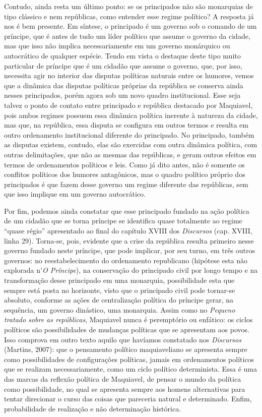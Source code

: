 Contudo, ainda resta um último ponto: se os principados não são
monarquias de tipo clássico e nem repúblicas, como entender esse regime
político? A resposta já nos é bem presente. Em síntese, o principado é
um governo sob o comando de um príncipe, que é antes de tudo um líder
político que assume o governo da cidade, mas que isso não implica
necessariamente em um governo monárquico ou autocrático de qualquer
espécie. Tendo em vista o destaque deste tipo muito particular de
príncipe que é um cidadão que assume o governo, que, por isso, necessita
agir no interior das disputas políticas naturais entre os humores, vemos
que a dinâmica das disputas políticas próprias da república se conserva
ainda nesses principados, porém agora sob um novo quadro institucional.
Esse seja talvez o ponto de contato entre principado e república
destacado por Maquiavel, pois ambos regimes possuem essa dinâmica
política inerente à natureza da cidade, mas que, na república, essa
disputa se configura em outros termos e resulta em outro ordenamento
institucional diferente do principado. No principado, também as disputas
existem, contudo, elas são exercidas com outra dinâmica política, com
outras delimitações, que não as mesmas das repúblicas, e geram outros
efeitos em termos de ordenamentos políticos e leis. Como já dito antes,
não é somente os conflitos políticos dos humores antagônicos, mas o
quadro político próprio dos principados é que fazem desse governo um
regime diferente das repúblicas, sem que isso implique em um governo
autocrático.

Por fim, podemos ainda constatar que esse principado fundado na ação
política de um cidadão que se torna príncipe se identifica quase
totalmente ao regime ``quase régio'' apresentado ao final do capítulo
XVIII dos \emph{Discursos} (cap. XVIII, linha 29). Torna-se, pois,
evidente que a crise da república resulta primeiro nesse governo fundado
neste príncipe, que pode implicar, por seu turno, em três outros
governos: no reestabelecimento do ordenamento republicano (hipótese esta
não explorada n'\emph{O Príncipe}), na conservação do principado civil
por longo tempo e na transformação desse principado em uma monarquia,
possibilidade esta que sempre está posta no horizonte, visto que o
principado civil pode tornar-se absoluto, conforme as ações de
centralização política do príncipe gerar, na sequência, um governo
dinástico, uma monarquia. Assim como no \emph{Pequeno tratado sobre as
repúblicas}, Maquiavel nunca é peremptório ou enfático: os ciclos
políticos são possibilidades de mudanças políticas que se apresentam aos
povos. Isso comprova em outro texto aquilo que havíamos constatado nos
\emph{Discursos} (Martins, 2007): que o pensamento político
maquiaveliano se apresenta sempre como possibilidades de configurações
políticas, jamais em ordenamentos políticos que se realizam
necessariamente, como um ciclo político determinista. Essa é uma das
marcas da reflexão política de Maquiavel, de pensar o mundo da política
como possibilidade, no qual se apresenta sempre aos homens alternativas
para tentar direcionar o curso das coisas que pareceria natural e
determinado. Enfim, probabilidade de realização e não determinação
histórica.

